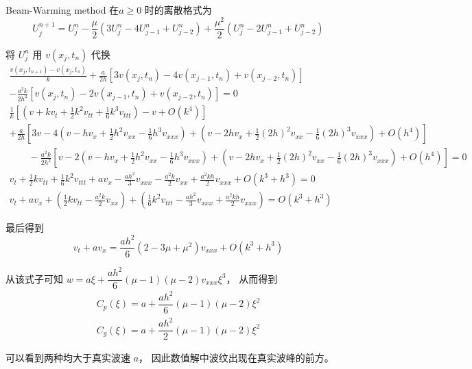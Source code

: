 \documentclass[a4paper]{article}
\begin{document}
\par Beam-Warming method 在$a\geq 0$ 时的离散格式为
\begin{equation}
    U_{j}^{n+1} = U_{j}^{n} - \frac{\mu}{2}
        \left(
            3U_{j}^{n}-4U_{j-1}^{n}+U_{j-2}^{n}
        \right) + \frac{\mu^2}{2}
        \left(
            U_{j}^{n}-2U_{j-1}^{n}+U_{j-2}^{n}
        \right)
\end{equation}
\par 将 $U_{j}^{n}$ 用 $v(x_j, t_n)$ 代换
\begin{equation}
    \begin{gathered}
        \frac{v(x_j, t_{n+1})-v(x_j, t_{n})}{k} + \frac{a}{2h}\left[
            3v(x_j, t_n)-4v(x_{j-1}, t_n)+v(x_{j-2}, t_n)
        \right]\\
        -\frac{a^2k}{2h^2}\left[
            v(x_j, t_n)-2v(x_{j-1}, t_n)+v(x_{j-2}, t_n)
        \right]=0\\
        \frac{1}{k}\left[
            \left(v+kv_t+\frac{1}{2}k^2v_{tt}+\frac{1}{6}k^3v_{ttt}\right)
            -v
            +O(k^4)
        \right]\qquad\qquad\qquad\qquad\qquad\qquad\qquad\qquad\qquad\qquad\qquad\\
        +\frac{a}{2h}\left[
            3v-4\left(v-hv_x+\frac{1}{2}h^2v_{xx}-\frac{1}{6}h^3v_{xxx}\right)
            +\left(v-2hv_x+\frac{1}{2}(2h)^2v_{xx}-\frac{1}{6}(2h)^3v_{xxx}\right)
            +O(h^4)
        \right]\\
        \qquad-\frac{a^2k}{2h^2}\left[
            v-2\left(v-hv_x+\frac{1}{2}h^2v_{xx}-\frac{1}{6}h^3v_{xxx}\right)
            +\left(v-2hv_x+\frac{1}{2}(2h)^2v_{xx}-\frac{1}{6}(2h)^3v_{xxx}\right)
            +O(h^4)
        \right]=0\\
        v_t+\frac{1}{2}kv_{tt}+\frac{1}{6}k^2v_{ttt}
        +av_x-\frac{ah^2}{3}v_{xxx}
        -\frac{a^2k}{2}v_{xx}+\frac{a^2kh}{2}v_{xxx}+O(k^3+h^3)=0\\
        v_t + av_x 
        +\left(
            \frac{1}{2}kv_{tt} - \frac{a^2k}{2}v_{xx}
        \right)
        +\left(
            \frac{1}{6}k^2v_{ttt} - \frac{ah^2}{3}v_{xxx} + \frac{a^2kh}{2}v_{xxx}
        \right)
        = O(k^3+h^3)
    \end{gathered}
\end{equation}
\par 最后得到
\begin{equation}
    v_t + av_x = \frac{ah^2}{6}(2-3\mu+\mu^2)v_{xxx} + O(k^3+h^3)
\end{equation}
\par 从该式子可知 $w = a\xi + \dfrac{ah^2}{6}(\mu-1)(\mu-2)v_{xxx}\xi^3$，
从而得到
\begin{equation}
    \begin{gathered}
        C_p(\xi)= a + \dfrac{ah^2}{6}(\mu-1)(\mu-2)\xi^2\\
        C_g(\xi)= a + \dfrac{ah^2}{2}(\mu-1)(\mu-2)\xi^2
    \end{gathered}
\end{equation}
\par 可以看到两种均大于真实波速 $a$，
因此数值解中波纹出现在真实波峰的前方。
\end{document}
